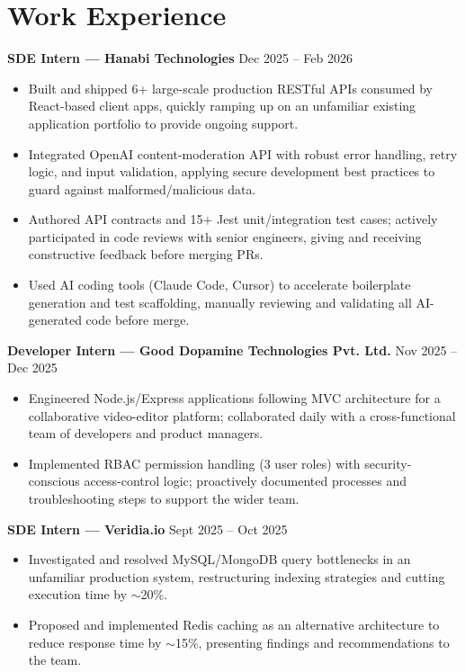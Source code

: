 \documentclass[10pt,letterpaper]{article}
\begin{document}
\section{Work Experience}
\vspace{2pt}

\textbf{SDE Intern --- Hanabi Technologies} \hfill Dec 2025 -- Feb 2026 \\[-10pt]
\begin{itemize}
  \item Built and shipped 6+ large-scale production RESTful APIs consumed by React-based client apps, quickly ramping up on an unfamiliar existing application portfolio to provide ongoing support.
  \item Integrated OpenAI content-moderation API with robust error handling, retry logic, and input validation, applying secure development best practices to guard against malformed/malicious data.
  \item Authored API contracts and 15+ Jest unit/integration test cases; actively participated in code reviews with senior engineers, giving and receiving constructive feedback before merging PRs.
  \item Used AI coding tools (Claude Code, Cursor) to accelerate boilerplate generation and test scaffolding, manually reviewing and validating all AI-generated code before merge.
\end{itemize}

\vspace{2pt}
\textbf{Developer Intern --- Good Dopamine Technologies Pvt. Ltd.} \hfill Nov 2025 -- Dec 2025 \\[-10pt]
\begin{itemize}
  \item Engineered Node.js/Express applications following MVC architecture for a collaborative video-editor platform; collaborated daily with a cross-functional team of developers and product managers.
  \item Implemented RBAC permission handling (3 user roles) with security-conscious access-control logic; proactively documented processes and troubleshooting steps to support the wider team.
\end{itemize}

\vspace{2pt}
\textbf{SDE Intern --- Veridia.io} \hfill Sept 2025 -- Oct 2025 \\[-10pt]
\begin{itemize}
  \item Investigated and resolved MySQL/MongoDB query bottlenecks in an unfamiliar production system, restructuring indexing strategies and cutting execution time by $\sim$20\%.
  \item Proposed and implemented Redis caching as an alternative architecture to reduce response time by $\sim$15\%, presenting findings and recommendations to the team.
\end{itemize}
\end{document}
